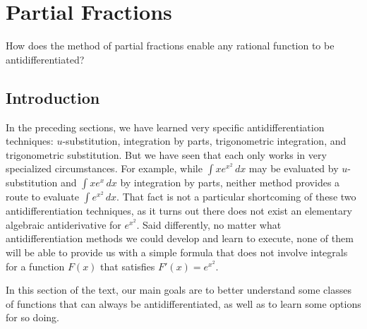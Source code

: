 \section{Partial Fractions} \label{S:5.4.PartFrac}

\begin{goals}
\item How does the method of partial fractions enable any rational function to be antidifferentiated?
\end{goals}

\subsection*{Introduction}

In the preceding sections, we have learned very specific antidifferentiation techniques:  $u$-substitution, integration by parts, trigonometric integration, and trigonometric substitution.  But we have seen that each only works in very specialized circumstances.  For example, while $\int xe^{x^2} \, dx$ may be evaluated by $u$-substitution and $\int x e^x \, dx$ by integration by parts, neither method provides a route to evaluate $\int e^{x^2} \, dx$.  That fact is not a particular shortcoming of these two antidifferentiation techniques, as it turns out there does not exist an elementary algebraic antiderivative for $e^{x^2}$.  Said differently, no matter what antidifferentiation methods we could develop and learn to execute, none of them will be able to provide us with a simple formula that does not involve integrals for a function $F(x)$ that satisfies $F'(x) = e^{x^2}$.

In this section of the text, our main goals are to better understand some classes of functions that can always be antidifferentiated, as well as to learn some options for so doing.  


